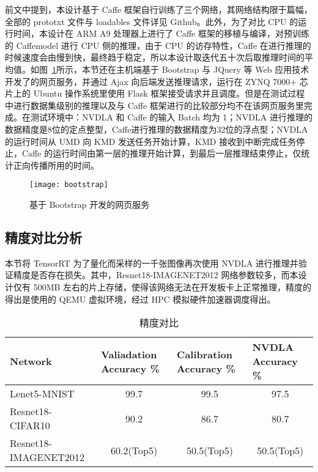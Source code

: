 前文中提到，本设计基于 Caffe 框架自行训练了三个网络，其网络结构限于篇幅，全部的 prototxt 文件与 loadables 文件详见 Github\cite{nvdla_loadables}。此外，为了对比 CPU 的运行时间，本设计在 ARM A9 处理器上进行了 Caffe 框架的移植与编译，对预训练的 Caffemodel 进行 CPU 侧的推理，由于 CPU 的访存特性，Caffe 在进行推理的时候速度会由慢到快，最终趋于稳定，所以本设计取迭代五十次后取推理时间的平均值。如图~\ref{fig:BootStrap}所示，本节还在主机端基于 Bootstrap 与 JQuery 等 Web 应用技术开发了的网页服务，并通过 Ajax 向后端发送推理请求，运行在 ZYNQ 7000+ 芯片上的 Ubuntu 操作系统里使用 Flask 框架接受请求并且调度。但是在测试过程中进行数据集级别的推理以及与 Caffe 框架进行的比较部分均不在该网页服务里完成。在测试环境中：NVDLA 和 Caffe 的输入 Batch 均为 1；NVDLA 进行推理的数据精度是8位的定点整型，Caffe进行推理的数据精度为32位的浮点型；NVDLA 的运行时间从 UMD 向 KMD 发送任务开始计算，KMD 接收到中断完成任务停止，Caffe 的运行时间由第一层的推理开始计算，到最后一层推理结束停止，仅统计正向传播所用的时间。

\begin{figure}[!htbp]
    \centering
    \texttt{[image: bootstrap]}
    \caption{基于 Bootstrap 开发的网页服务}
    \label{fig:BootStrap}
\end{figure}

\subsection{精度对比分析}

本节将 TensorRT 为了量化而采样的一千张图像再次使用 NVDLA 进行推理并验证精度是否存在损失。其中，Resnet18-IMAGENET2012 网络参数较多，而本设计仅有 500MB 左右的片上存储，使得该网络无法在开发板卡上正常推理，精度的得出是使用的 QEMU 虚拟环境，经过 HPC 模拟硬件加速器调度得出。

\begin{table}[!htbp]
    \caption{精度对比}
    \label{tab:Qualifications Report}
    \centering
    \footnotesize%
    \setlength{\tabcolsep}{4pt}%
    \renewcommand{\arraystretch}{1.2}%
    \begin{tabular}{lccc}
        \toprule
        \textbf{Network}      & \multicolumn{1}{l}{\textbf{Valiadation Accuracy \%}} & \multicolumn{1}{l}{\textbf{Calibration Accuracy \%}}  & \multicolumn{1}{l}{\textbf{NVDLA Accuracy \%}} \\
        \midrule
        Lenet5-MNIST          & 99.7                                                 & 99.5                                                 & 97.5                                                 \\  
        Resnet18-CIFAR10      & 90.2                                                 & 86.7                                                 & 80.7                                                 \\
        Resnet18-IMAGENET2012 & 60.2(Top5)                                           & 50.5(Top5)                                           & 50.5(Top5)                                           \\
        \bottomrule                   
    \end{tabular}
\end{table}

